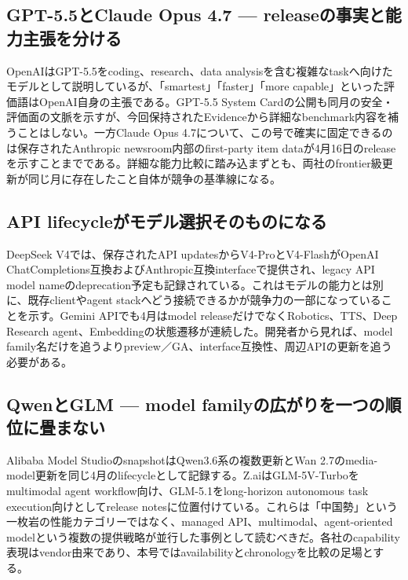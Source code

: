 \subsection{GPT-5.5とClaude Opus 4.7 — releaseの事実と能力主張を分ける}

OpenAIはGPT-5.5をcoding、research、data analysisを含む複雑なtaskへ向けたモデルとして説明しているが、「smartest」「faster」「more capable」といった評価語はOpenAI自身の主張である。GPT-5.5 System Cardの公開も同月の安全・評価面の文脈を示すが、今回保持されたEvidenceから詳細なbenchmark内容を補うことはしない。一方Claude Opus 4.7について、この号で確実に固定できるのは保存されたAnthropic newsroom内部のfirst-party item dataが4月16日のreleaseを示すことまでである。詳細な能力比較に踏み込まずとも、両社のfrontier級更新が同じ月に存在したこと自体が競争の基準線になる。\autocite{src-a07eb39dec04,src-dfe7e0c6ff39,src-f6aa679babd7}


\subsection{API lifecycleがモデル選択そのものになる}

DeepSeek V4では、保存されたAPI updatesからV4-ProとV4-FlashがOpenAI ChatCompletions互換およびAnthropic互換interfaceで提供され、legacy API model nameのdeprecation予定も記録されている。これはモデルの能力とは別に、既存clientやagent stackへどう接続できるかが競争力の一部になっていることを示す。Gemini APIでも4月はmodel releaseだけでなくRobotics、TTS、Deep Research agent、Embeddingの状態遷移が連続した。開発者から見れば、model family名だけを追うよりpreview／GA、interface互換性、周辺APIの更新を追う必要がある。\autocite{src-a24fd97eb3d0,src-e547d0d8cbe3}


\subsection{QwenとGLM — model familyの広がりを一つの順位に畳まない}

Alibaba Model StudioのsnapshotはQwen3.6系の複数更新とWan 2.7のmedia-model更新を同じ4月のlifecycleとして記録する。Z.aiはGLM-5V-Turboをmultimodal agent workflow向け、GLM-5.1をlong-horizon autonomous task execution向けとしてrelease notesに位置付けている。これらは「中国勢」という一枚岩の性能カテゴリーではなく、managed API、multimodal、agent-oriented modelという複数の提供戦略が並行した事例として読むべきだ。各社のcapability表現はvendor由来であり、本号ではavailabilityとchronologyを比較の足場とする。\autocite{src-9156c37fb1c2,src-eac8dfbeb78c}


